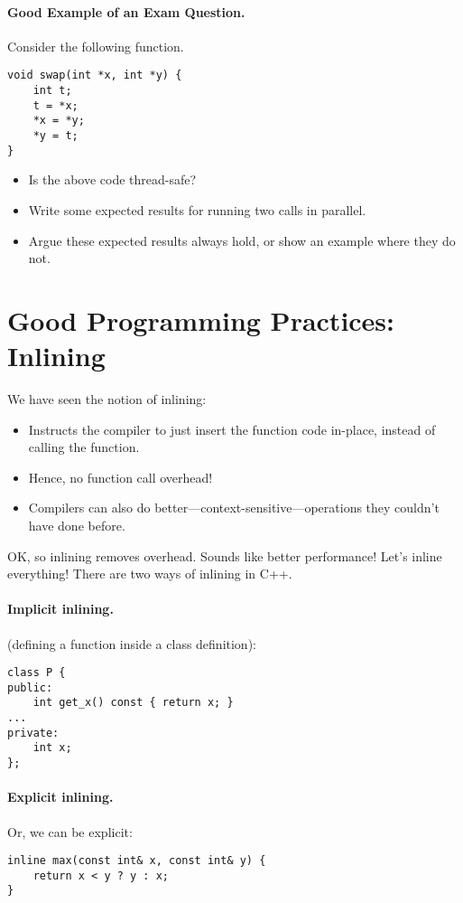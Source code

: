 \paragraph{Good Example of an Exam Question.} Consider the following function.

  \begin{lstlisting}
void swap(int *x, int *y) {
    int t;
    t = *x;
    *x = *y;
    *y = t;
}  
  \end{lstlisting}

  \begin{itemize}
    \item Is the above code thread-safe?
    \item Write some expected results for running two calls in parallel.
    \item Argue these expected results always hold, or show an example where
      they do not.
  \end{itemize}

\section*{Good Programming Practices: Inlining}
We have seen the notion of inlining:
  \begin{itemize}
    \item Instructs the compiler to just insert the function code in-place,
      instead of calling the function.
    \item Hence, no function call overhead!
    \item Compilers can also do better---context-sensitive---operations they couldn't
      have done before.
  \end{itemize}

OK, so inlining removes overhead. Sounds like better performance! Let's inline everything!
There are two ways of inlining in C++.

\paragraph{Implicit inlining.} (defining a function inside a class definition):
  \begin{lstlisting}
class P {
public:
    int get_x() const { return x; }
...
private:
    int x;
};
  \end{lstlisting}

\paragraph{Explicit inlining.} Or, we can be explicit:
  \begin{lstlisting}
inline max(const int& x, const int& y) {
    return x < y ? y : x;
}
  \end{lstlisting}

